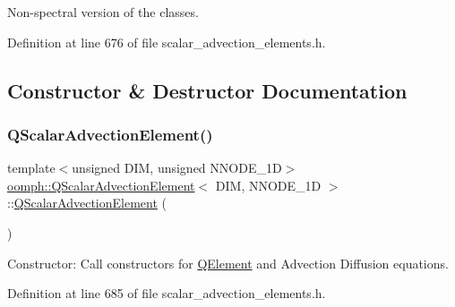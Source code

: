 Non-\/spectral version of the classes. 

Definition at line 676 of file scalar\+\_\+advection\+\_\+elements.\+h.



\subsection{Constructor \& Destructor Documentation}
\mbox{\label{classoomph_1_1QScalarAdvectionElement_ad460805f1986b3984355da7e0d4fd2fc}} 
\subsubsection{\texorpdfstring{Q\+Scalar\+Advection\+Element()}{QScalarAdvectionElement()}\hspace{0.1cm}{\footnotesize\ttfamily [1/2]}}
{\footnotesize\ttfamily template$<$unsigned D\+IM, unsigned N\+N\+O\+D\+E\+\_\+1D$>$ \\
\hyperlink{classoomph_1_1QScalarAdvectionElement}{oomph\+::\+Q\+Scalar\+Advection\+Element}$<$ D\+IM, N\+N\+O\+D\+E\+\_\+1D $>$\+::\hyperlink{classoomph_1_1QScalarAdvectionElement}{Q\+Scalar\+Advection\+Element} (\begin{DoxyParamCaption}{ }\end{DoxyParamCaption})\hspace{0.3cm}{\ttfamily [inline]}}



Constructor\+: Call constructors for \hyperlink{classoomph_1_1QElement}{Q\+Element} and Advection Diffusion equations. 



Definition at line 685 of file scalar\+\_\+advection\+\_\+elements.\+h.

\mbox{\label{classoomph_1_1QScalarAdvectionElement_acb0db915bd078a2cf8170e1dcb598754}} 
